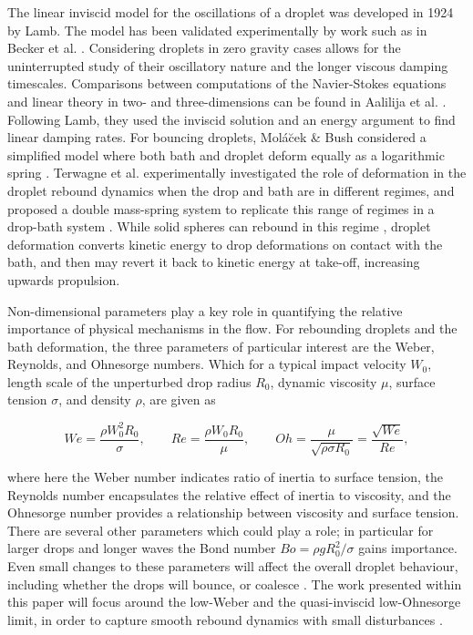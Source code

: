 The linear inviscid model for the oscillations of a droplet was developed in 1924 by Lamb\cite{lamb1924hydrodynamics}. The model has been validated experimentally by work such as in Becker et al. \cite{becker1991experimental}. Considering droplets in zero gravity cases allows for the uninterrupted study of their oscillatory nature \cite{wang1996oscillations} and the longer viscous damping timescales. Comparisons between computations of the Navier-Stokes equations and linear theory in two- and three-dimensions can be found in Aalilija et al. \cite{aalilija2020analytical}. Following Lamb, they used the inviscid solution and an energy argument to find linear damping rates. For bouncing droplets,  Mol\'{a}\u{c}ek \& Bush considered a simplified model where both bath and droplet deform equally as a logarithmic spring \cite{molavcek2013drops}. Terwagne et al. experimentally investigated the role of deformation in the droplet rebound dynamics when the drop and bath are in different regimes, and proposed a double mass-spring system to replicate this range of regimes in a drop-bath system \cite{terwagne2013role}. While solid spheres can rebound in this regime \cite{galeano2021capillary}, droplet deformation converts kinetic energy to drop deformations on contact with the bath, and then may revert it back to kinetic energy at take-off, increasing upwards propulsion.


Non-dimensional parameters play a key role in quantifying the relative importance of physical mechanisms in the flow. For rebounding droplets and the bath deformation, the three parameters of particular interest are the Weber, Reynolds, and Ohnesorge numbers. Which for a typical impact velocity $W_0$, length scale of the unperturbed drop radius $R_0$, dynamic viscosity $\mu$, surface tension $\sigma$, and density $\rho$, are given as

\begin{equation*}
   W\!e = \frac{\rho W_0^2 R_0}{\sigma}, \qquad Re = \frac{\rho W_0 R_0}{\mu} ,\qquad Oh = \frac{\mu}{\sqrt{\rho \sigma R_0}} =  \frac{\sqrt{W\!e}}{Re}, 
\end{equation*}

where here the Weber number indicates ratio of inertia to surface tension, the Reynolds number encapsulates the relative effect of inertia to viscosity, and the Ohnesorge number provides a relationship between viscosity and surface tension. There are several other parameters which could play a role; in particular for larger drops and longer waves the Bond number $Bo = \rho g R_0^2/\sigma$ gains importance. Even small changes to these parameters will affect the overall droplet behaviour, including whether the drops will bounce, or coalesce \cite{lewin2024collision}. The work presented within this paper will focus around the low-Weber and the quasi-inviscid low-Ohnesorge limit, in order to capture smooth rebound dynamics with small disturbances \cite{sprittles2024gas}.



